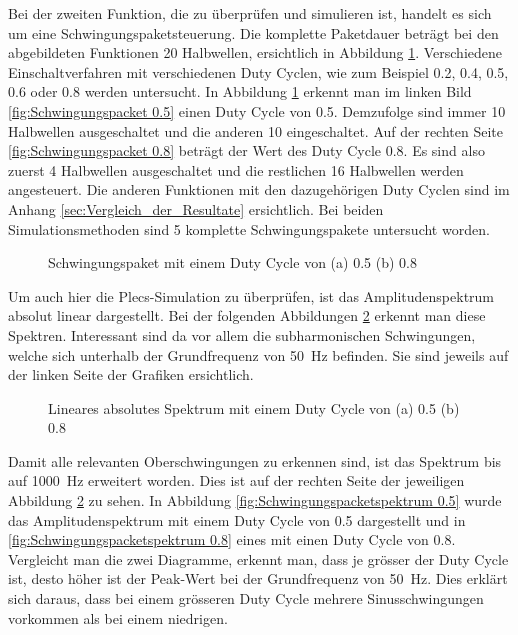 Bei der zweiten Funktion, die zu überprüfen und simulieren ist, handelt es sich um eine Schwingungspaketsteuerung. Die komplette Paketdauer beträgt bei den abgebildeten Funktionen 20 Halbwellen, ersichtlich in Abbildung \ref{fig:Schwingungspaket Matlab}. Verschiedene Einschaltverfahren mit verschiedenen Duty Cyclen, wie zum Beispiel 0.2, 0.4, 0.5, 0.6 oder 0.8 werden untersucht. In Abbildung \ref{fig:Schwingungspaket Matlab} erkennt man im linken Bild \ref{fig:Schwingungspacket 0.5} einen Duty Cycle von 0.5. Demzufolge sind immer 10 Halbwellen ausgeschaltet und die anderen 10 eingeschaltet.
Auf der rechten Seite \ref{fig:Schwingungspacket 0.8} beträgt der Wert des Duty Cycle 0.8. Es sind also zuerst 4 Halbwellen ausgeschaltet und die restlichen 16 Halbwellen werden angesteuert. Die anderen Funktionen mit den dazugehörigen Duty Cyclen sind im Anhang \ref{sec:Vergleich_der_Resultate} ersichtlich. Bei beiden Simulationsmethoden sind 5 komplette Schwingungspakete untersucht worden. 

\begin{figure}[ht!]
	\centering
	\qquad
	\caption{Schwingungspaket mit einem Duty Cycle von (a) 0.5 (b) 0.8}
	\label{fig:Schwingungspaket Matlab}
\end{figure} 

Um auch hier die Plecs-Simulation zu überprüfen, ist das Amplitudenspektrum absolut linear dargestellt. Bei der folgenden Abbildungen \ref{fig:Schwingungspaketspektrum Matlab} erkennt man diese Spektren. Interessant sind da vor allem die subharmonischen Schwingungen, welche sich unterhalb der Grundfrequenz von \SI{50}{Hz} befinden. Sie sind jeweils auf der linken Seite der Grafiken ersichtlich.   

\begin{figure}[ht!]
	\centering
	\qquad
	\caption{Lineares absolutes Spektrum mit einem Duty Cycle von (a) 0.5 (b) 0.8}
	\label{fig:Schwingungspaketspektrum Matlab}
\end{figure}


Damit alle relevanten Oberschwingungen zu erkennen sind, ist das Spektrum bis auf \SI{1000}{Hz} erweitert worden. Dies ist auf der rechten Seite der jeweiligen Abbildung \ref{fig:Schwingungspaketspektrum Matlab} zu sehen. In Abbildung \ref{fig:Schwingungspacketspektrum 0.5} wurde das Amplitudenspektrum mit einem Duty Cycle von 0.5 dargestellt und in \ref{fig:Schwingungspacketspektrum 0.8} eines mit einen Duty Cycle von 0.8. Vergleicht man die zwei Diagramme, erkennt man, dass je grösser der Duty Cycle ist, desto höher ist der Peak-Wert bei der Grundfrequenz von \SI{50}{Hz}. Dies erklärt sich daraus, dass bei einem grösseren Duty Cycle mehrere Sinusschwingungen vorkommen als bei einem niedrigen.\\


